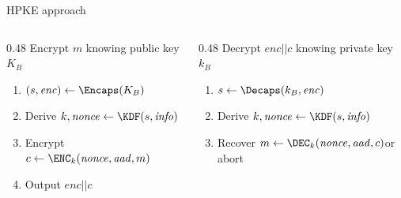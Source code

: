 \begin{frame}{HPKE approach}
  \begin{columns}[t]
    \begin{column}{0.48\textwidth}
      Encrypt $m$ knowing public key $K_B$

      \vspace*{0.5em}

      \begin{enumerate}[<+(1)->]
        \item $(s, \mathit{enc})\gets\Encaps(K_B)$
        \item Derive $k, \mathit{nonce}\gets\KDF(s, \mathit{info})$
        \item Encrypt $c\gets\ENC_k(\mathit{nonce}, \mathit{aad}, m)$
        \item Output $\mathit{enc}||c$
      \end{enumerate}
    \end{column}
    \begin{column}{0.48\textwidth}
      \pause
      Decrypt $\mathit{enc}||c$ knowing private key $k_B$

      \vspace*{0.5em}

      \begin{enumerate}[<+(1)->]
        \item $s\gets\Decaps(k_B, \mathit{enc})$
        \item Derive $k, \mathit{nonce}\gets\KDF(s, \mathit{info})$
        \item Recover $m\gets\DEC_k(\mathit{nonce}, \mathit{aad}, c)$\newline or abort
      \end{enumerate}
    \end{column}
  \end{columns}
\end{frame}

